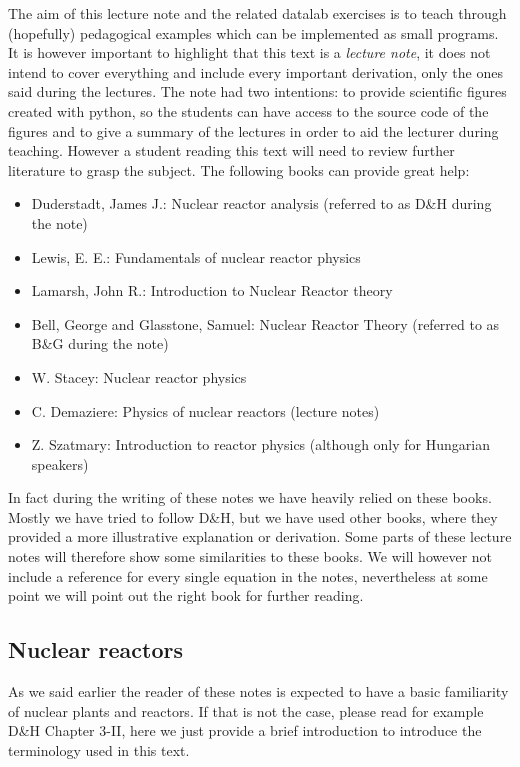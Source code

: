 The aim of this lecture note and the related datalab exercises is to teach through (hopefully) pedagogical examples which can be implemented as small programs. It is however important to highlight that this text is a \textit{lecture note}, it does not intend to cover everything and include every important derivation, only the ones said during the lectures. The note had two intentions: to provide scientific figures created with python, so the students can have access to the source code of the figures and to give a summary of the lectures in order to aid the lecturer during teaching. However a student reading this text will need to review further literature to grasp the subject. The following books can provide great help:

\begin{itemize}
\item Duderstadt, James J.: Nuclear reactor analysis (referred to as D\&H during the note)
\item Lewis, E. E.: Fundamentals of nuclear reactor physics
\item Lamarsh, John R.: Introduction to Nuclear Reactor theory
\item Bell, George and Glasstone, Samuel: Nuclear Reactor Theory (referred to as B\&G during the note)
\item W. Stacey: Nuclear reactor physics
\item C. Demaziere: Physics of nuclear reactors (lecture notes)
\item Z. Szatmary: Introduction to reactor physics (although only for Hungarian speakers)
\end{itemize}

In fact during the writing of these notes we have heavily relied on these books. Mostly we have tried to follow D\&H, but we have used other books, where they provided a more illustrative explanation or derivation. Some parts of these lecture notes will therefore show some similarities to these books. We will however not include a reference for every single equation in the notes, nevertheless at some point we will point out the right book for further reading.

\subsection{Nuclear reactors}

As we said earlier the reader of these notes is expected to have a basic familiarity of nuclear plants and reactors. If that is not the case, please read for example D\&H Chapter 3-II, here we just provide a brief introduction to introduce the terminology used in this text.

